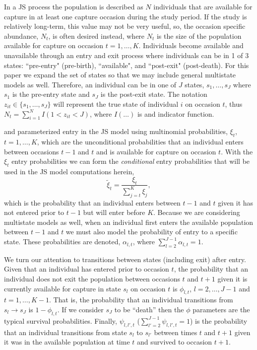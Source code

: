 \documentclass[12pt]{article}
\begin{document}
In a JS process the population is described as $N$ individuals that are available for capture in at least one capture occasion during the study period. If the study is relatively long-term, this value may not be very useful, so, the occasion specific abundance, $N_t$, is often desired instead, where $N_t$ is the size of the population available for capture on occasion $t=1,\dots,K$. Individuals become available and unavailable through an entry and exit process where individuals can be in 1 of 3 states: ``pre-entry" (pre-birth), ``available", and ``post-exit" (post-death). For this paper we expand the set of states so that we may include general multistate models as well. Therefore, an individual can be in one of $J$ states, $s_1,\dots,s_J$ where $s_1$ is the pre-entry state and $s_J$ is the post-exit state. The notation $z_{it} \in \{s_1,\dots,s_J\}$ will represent the true state of individual $i$ on occasion $t$, thus $N_t = \sum_{i=1}^N I(1 < z_{it} < J)$, where $I(\dots)$ is and indicator function. 


 \citet{schwarz1996general} and \cite{crosbie1985parsimonious} parameterized entry in the JS model using multinomial probabilities, $\xi_t$, $t=1,\dots,K$,  which are the unconditional probabilities that an individual enters between occasions $t-1$ and $t$ and is available for capture on occasion $t$. With the $\xi_t$ entry probabilities we can form the {\it conditional} entry probabilities that will be used in the JS model computations herein,
\[
\tilde{\xi}_t = \frac{\xi_t}{\sum_{j=t}^K \xi_j},
\] 
which is the probability that an individual enters between $t-1$ and $t$ given it has not entered prior to $t-1$ but will enter before $K$. Because we are considering multistate models as well, when an individual first enters the available population between $t-1$ and $t$ we must also model the probability of entry to a specific state. These probabilities are denoted,  $\alpha_{l,t}$, where $\sum_{l=2}^{J-1} \alpha_{l,t}=1$. 

We turn our attention to transitions between states (including exit) after entry. Given that an individual has entered prior to occasion $t$, the probability that an individual does not exit the population between occasions $t$ and $t+1$ given it is currently available for capture in state $s_l$ on occasion $t$ is $\phi_{l,t}$, $l=2,\dots,J-1$ and $t=1,\dots,K-1$. That is, the probability that an individual transitions from $s_l \to s_J$ is $1-\phi_{l,t}$. If we consider $s_J$ to be ``death'' then the $\phi$ parameters are the typical survival probabilities. Finally, $\psi_{l,l',t}$ ($\sum_{l'=2}^{J-1}\psi_{l,l',t} = 1$) is the probability that an individual transitions from state $s_l$ to $s_{l'}$ between times $t$ and $t+1$ given it was in the available population at time $t$ and survived to occasion $t+1$. 
\end{document}
